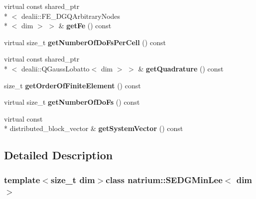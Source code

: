 \begin{DoxyCompactItemize}
\item 
\hypertarget{classnatrium_1_1SEDGMinLee_a7fd488e872e5cf9870be39f07a2dcd74}{virtual const shared\-\_\-ptr\\*
$<$ dealii\-::\-F\-E\-\_\-\-D\-G\-Q\-Arbitrary\-Nodes\\*
$<$ dim $>$ $>$ \& {\bfseries get\-Fe} () const }\label{classnatrium_1_1SEDGMinLee_a7fd488e872e5cf9870be39f07a2dcd74}

\item 
\hypertarget{classnatrium_1_1SEDGMinLee_a5dac839ef4963af315dba5f201bd763c}{virtual size\-\_\-t {\bfseries get\-Number\-Of\-Do\-Fs\-Per\-Cell} () const }\label{classnatrium_1_1SEDGMinLee_a5dac839ef4963af315dba5f201bd763c}

\item 
\hypertarget{classnatrium_1_1SEDGMinLee_a4db0d2b4c857962d5425f755be3daf13}{virtual const shared\-\_\-ptr\\*
$<$ dealii\-::\-Q\-Gauss\-Lobatto$<$ dim $>$ $>$ \& {\bfseries get\-Quadrature} () const }\label{classnatrium_1_1SEDGMinLee_a4db0d2b4c857962d5425f755be3daf13}

\item 
\hypertarget{classnatrium_1_1SEDGMinLee_a745a65de3ee72a250c0706e6c7fcc361}{size\-\_\-t {\bfseries get\-Order\-Of\-Finite\-Element} () const }\label{classnatrium_1_1SEDGMinLee_a745a65de3ee72a250c0706e6c7fcc361}

\item 
\hypertarget{classnatrium_1_1SEDGMinLee_af667cda1a894340f614da67c0a0ae5da}{virtual size\-\_\-t {\bfseries get\-Number\-Of\-Do\-Fs} () const }\label{classnatrium_1_1SEDGMinLee_af667cda1a894340f614da67c0a0ae5da}

\item 
\hypertarget{classnatrium_1_1SEDGMinLee_ac4d17489cf8bf5e98bd7bd4e3e32f0d4}{virtual const \\*
distributed\-\_\-block\-\_\-vector \& {\bfseries get\-System\-Vector} () const }\label{classnatrium_1_1SEDGMinLee_ac4d17489cf8bf5e98bd7bd4e3e32f0d4}

\end{DoxyCompactItemize}


\subsection{Detailed Description}
\subsubsection*{template$<$size\-\_\-t dim$>$class natrium\-::\-S\-E\-D\-G\-Min\-Lee$<$ dim $>$}

